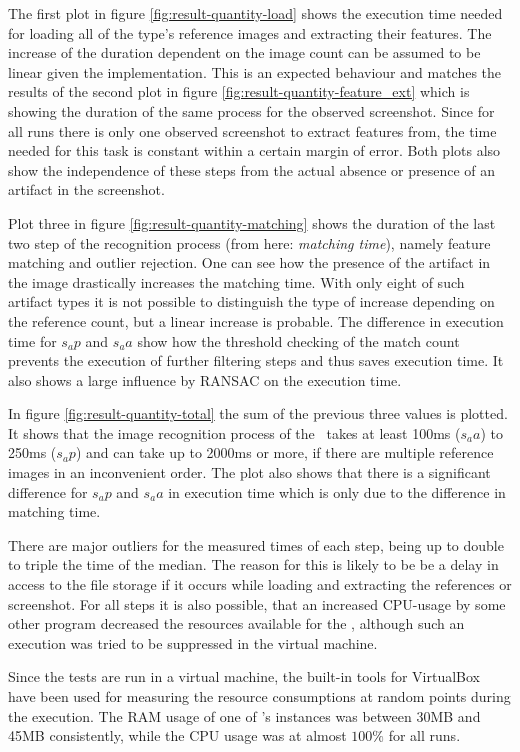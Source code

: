 The first plot in figure \ref{fig:result-quantity-load} shows the execution time needed for loading all of the type's reference images and extracting their features. The increase of the duration dependent on the image count can be assumed to be linear given the implementation. This is an expected behaviour and matches the results of the second plot in figure \ref{fig:result-quantity-feature_ext} which is showing the duration of the same process for the observed screenshot. Since for all runs there is only one observed screenshot to extract features from, the time needed for this task is constant within a certain margin of error. Both plots also show the independence of these steps from the actual absence or presence of an artifact in the screenshot.

Plot three in figure \ref{fig:result-quantity-matching} shows the duration of the last two step of the recognition process (from here: \emph{matching time}), namely feature matching and outlier rejection. One can see how the presence of the artifact in the image drastically increases the matching time. With only eight of such artifact types it is not possible to distinguish the type of increase depending on the reference count, but a linear increase is probable. The difference in execution time for $s_ap$ and $s_aa$ show how the threshold checking of the match count prevents the execution of further filtering steps and thus saves execution time. It also shows a large influence by RANSAC on the execution time.

In figure \ref{fig:result-quantity-total} the sum of the previous three values is plotted. It shows that the image recognition process of the \vd~takes at least 100ms ($s_aa$) to 250ms ($s_ap$) and can take up to 2000ms or more, if there are multiple reference images in an inconvenient order. The plot also shows that there is a significant difference for $s_ap$ and $s_aa$ in execution time which is only due to the difference in matching time.

There are major outliers for the measured times of each step, being up to double to triple the time of the median. The reason for this is likely to be be a delay in access to the file storage if it occurs while loading and extracting the references or screenshot. For all steps it is also possible, that an increased CPU-usage by some other program decreased the resources available for the \vd, although such an execution was tried to be suppressed in the virtual machine.

Since the tests are run in a virtual machine, the built-in tools for VirtualBox have been used for measuring the resource consumptions at random points during the execution. The RAM usage of one of \vd's instances was between 30MB and 45MB consistently, while the CPU usage was at almost $100\%$ for all runs.

